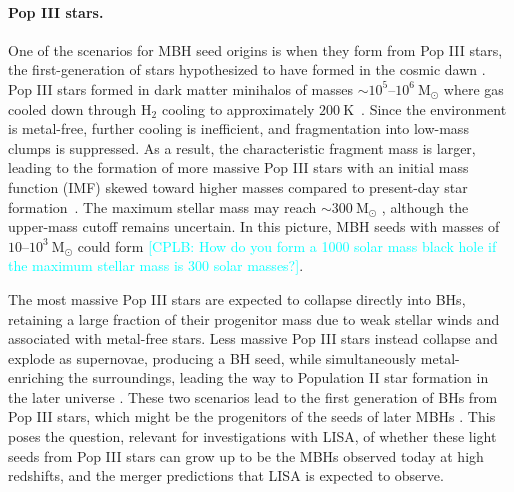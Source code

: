 \documentclass[a4paper,12pt]{article}
\newcommand{\cplb}[1]{\textcolor{cyan}{[CPLB: #1]}}
\begin{document}
\paragraph{Pop III stars.}
One of the scenarios for MBH seed origins is when they form from Pop III stars, the first-generation of stars hypothesized to have formed in the cosmic dawn \cite{abel2002formation,bromm2002formation,o2007population}. Pop III stars formed in dark matter minihalos of masses $\sim10^5$--$10^6~\mathrm{M}_{\odot}$ where gas cooled down through $\text{H}_{2}$ cooling to approximately $200~\mathrm{K}$~\cite{abel2002formation}. Since the environment is metal-free, further cooling is inefficient, and fragmentation into low-mass clumps is suppressed. As a result, the characteristic fragment mass is larger, leading to the formation of more massive Pop III stars with an initial mass function (IMF) skewed toward higher masses compared to present-day star formation~\cite{turk2009formation, clark2011gravitational}. The maximum stellar mass may reach $\sim300~\mathrm{M}_{\odot}$ \cite{mehta2026growth}, although the upper-mass cutoff remains uncertain. In this picture, MBH seeds with masses of $10$--$10^3~\mathrm{M}_{\odot}$ could form \cite{hirano2014one} \cplb{How do you form a 1000 solar mass black hole if the maximum stellar mass is 300 solar masses?}. 

The most massive Pop III stars are expected to collapse directly into BHs, retaining a large fraction of their progenitor mass due to weak stellar winds and associated with metal-free stars. Less massive Pop III stars instead collapse and explode as supernovae, producing a BH seed, while simultaneously metal-enriching the surroundings, leading the way to Population II star formation in the later universe \cite{o2015probing,xu2016late}. These two scenarios lead to the first generation of BHs from Pop III stars, which might be the progenitors of the seeds of later MBHs \cite{madau2001massive,hirano2014one}. This poses the question, relevant for investigations with LISA, of whether these light seeds from Pop III stars can grow up to be the MBHs observed today at high redshifts, and the merger predictions that LISA is expected to observe.
\end{document}
